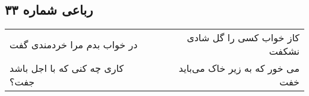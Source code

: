 \begin{center}
\section*{رباعی شماره ۳۳}
\label{sec:sh033}
\begin{longtable}{l p{0.5cm} r}
در خواب بدم مرا خردمندی گفت
&&
کاز خواب کسی را گل شادی نشکفت
\\
کاری چه کنی که با اجل باشد جفت؟
&&
می خور که به زیر خاک می‌باید خفت
\\
\end{longtable}
\end{center}
